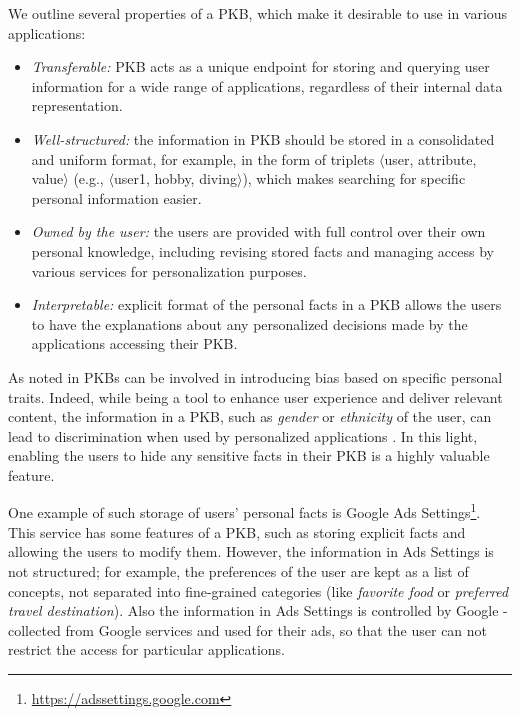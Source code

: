 We outline several properties of a PKB, which make it desirable to use in various applications:
\begin{itemize}
    \item \textit{Transferable:} PKB acts as a unique endpoint for storing and querying user information for a wide range of applications, regardless of their internal data representation.
    \item \textit{Well-structured:} the information in PKB should be stored in a consolidated and uniform format, for example, in the form of triplets $\langle$user, attribute, value$\rangle$ (e.g., $\langle$user1, hobby, diving$\rangle$), which makes searching for specific personal information easier.
    \item \textit{Owned by the user:} the users are provided with full control over their own personal knowledge, including revising stored facts and managing access by various services for personalization purposes.
    \item \textit{Interpretable:} explicit format of the personal facts in a PKB allows the users to have the explanations about any personalized decisions made by the applications accessing their PKB.
\end{itemize}

As noted in \citet{gerritse2020bias} PKBs can be involved in introducing bias based on specific personal traits. Indeed, while being a tool to enhance user experience and deliver relevant content, the information in a PKB, such as \textit{gender} or \textit{ethnicity} of the user, can lead to discrimination when used by personalized applications \cite{datta2015automated,  ali2019discrimination}. In this light, enabling the users to hide any sensitive facts in their PKB is a highly valuable feature.

One example of such storage of users' personal facts is Google Ads Settings\footnote{\url{https://adssettings.google.com}}. This service has some features of a PKB, such as storing explicit facts and allowing the users to modify them. However, the information in Ads Settings is not structured; for example, the preferences of the user are kept as a list of concepts, not separated into fine-grained categories (like \textit{favorite food} or \textit{preferred travel destination}). Also the information in Ads Settings is controlled by Google - collected from Google services and used for their ads, so that the user can not restrict the access for particular applications. %

